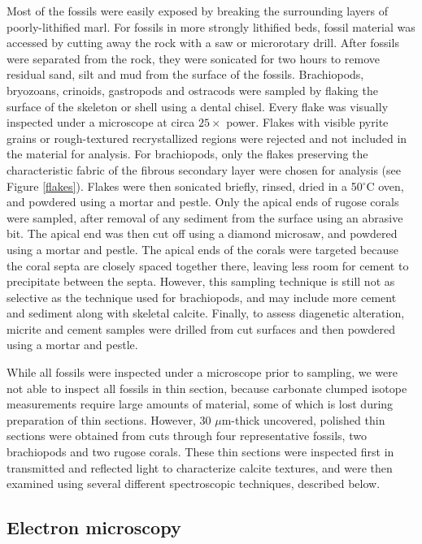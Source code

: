 \documentclass[5p, authoryear]{elsarticle}
\newcommand{\degrees}{$^{\circ}$}
\begin{document}
Most of the fossils were easily exposed by breaking the surrounding layers of poorly-lithified marl. For fossils in more strongly lithified beds, fossil material was accessed by cutting away the rock with a saw or microrotary drill. After fossils were separated from the rock, they were sonicated for two hours to remove residual sand, silt and mud from the surface of the fossils. Brachiopods, bryozoans, crinoids, gastropods and ostracods were sampled by flaking the surface of the skeleton or shell using a dental chisel. Every flake was visually inspected under a microscope at circa $25\times$ power. Flakes with visible pyrite grains or rough-textured recrystallized regions were rejected and not included in the material for analysis. For brachiopods, only the flakes preserving the characteristic fabric of the fibrous secondary layer were chosen for analysis (see Figure \ref{flakes}). Flakes were then sonicated briefly, rinsed, dried in a 50\degrees C oven, and powdered using a mortar and pestle. Only the apical ends of rugose corals were sampled, after removal of any sediment from the surface using an abrasive bit. The apical end was then cut off using a diamond microsaw, and powdered using a mortar and pestle. The apical ends of the corals were targeted because the coral septa are closely spaced together there, leaving less room for cement to precipitate between the septa. However, this sampling technique is still not as selective as the technique used for brachiopods, and may include more cement and sediment along with skeletal calcite. Finally, to assess diagenetic alteration, micrite and cement samples were drilled from cut surfaces and then powdered using a mortar and pestle. 

While all fossils were inspected under a microscope prior to sampling, we were not able to inspect all fossils in thin section, because carbonate clumped isotope measurements require large amounts of material, some of which is lost during preparation of thin sections. However, 30 $\mu$m-thick uncovered, polished thin sections were obtained from cuts through four representative fossils, two brachiopods and two rugose corals. These thin sections were inspected first in transmitted and reflected light to characterize calcite textures, and were then examined using several different spectroscopic techniques, described below. 

\subsection{Electron microscopy}
\end{document}
